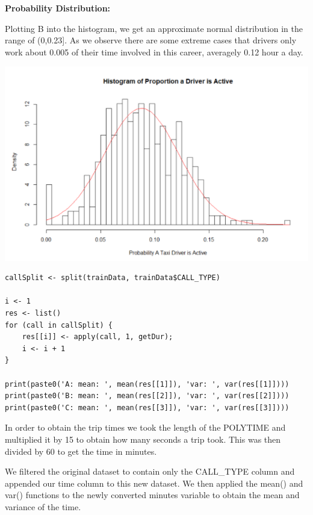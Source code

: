 \documentclass[11pt]{article}
\begin{document}
\textbf{Probability Distribution:}
\par
Plotting B into the histogram, we get an approximate normal distribution in the range of (0,0.23]. As we observe there are some extreme cases that drivers only work about 0.005 of their time involved in this career, averagely 0.12 hour a day.

\noindent\includegraphics{Hist(PropActDriv).png}\\

\begin{lstlisting}
callSplit <- split(trainData, trainData$CALL_TYPE)

i <- 1
res <- list()
for (call in callSplit) {
	res[[i]] <- apply(call, 1, getDur);
	i <- i + 1
}
  
print(paste0('A: mean: ', mean(res[[1]]), 'var: ', var(res[[1]])))
print(paste0('B: mean: ', mean(res[[2]]), 'var: ', var(res[[2]])))
print(paste0('C: mean: ', mean(res[[3]]), 'var: ', var(res[[3]])))
\end{lstlisting}

\flushleft\par
In order to obtain the trip times we took the length of the POLYTIME and multiplied it by 15 to obtain how many seconds a trip took. This was then divided by 60 to get the time in minutes.

\par
We filtered the original dataset to contain only the CALL\_TYPE column and appended our time column to this new dataset. We then applied the mean() and var() functions to the newly converted minutes variable to obtain the mean and variance of the time.
\end{document}
